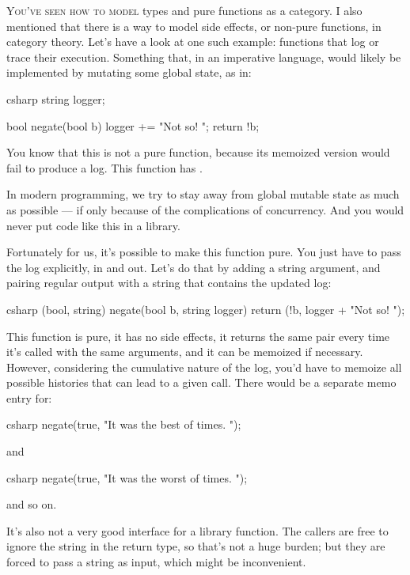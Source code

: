 
\lettrine[lhang=0.17]{Y}{ou've seen how to model} types and pure functions as a category. I also
mentioned that there is a way to model side effects, or non-pure
functions, in category theory. Let's have a look at one such example:
functions that log or trace their execution. Something that, in an
imperative language, would likely be implemented by mutating some global
state, as in:

\begin{snip}{csharp}
string logger;

bool negate(bool b) {
    logger += "Not so! ";
    return !b;
}
\end{snip}
You know that this is not a pure function, because its memoized version
would fail to produce a log. This function has .

In modern programming, we try to stay away from global mutable state as
much as possible --- if only because of the complications of
concurrency. And you would never put code like this in a library.

Fortunately for us, it's possible to make this function pure. You just
have to pass the log explicitly, in and out. Let's do that by adding a
string argument, and pairing regular output with a string that contains
the updated log:

\begin{snip}{csharp}
(bool, string) negate(bool b, string logger) {
    return (!b, logger + "Not so! ");
}
\end{snip}
This function is pure, it has no side effects, it returns the same pair
every time it's called with the same arguments, and it can be memoized
if necessary. However, considering the cumulative nature of the log,
you'd have to memoize all possible histories that can lead to a given
call. There would be a separate memo entry for:

\begin{snip}{csharp}
negate(true, "It was the best of times. ");
\end{snip}
and

\begin{snip}{csharp}
negate(true, "It was the worst of times. ");
\end{snip}
and so on.

It's also not a very good interface for a library function. The callers
are free to ignore the string in the return type, so that's not a huge
burden; but they are forced to pass a string as input, which might be
inconvenient.


